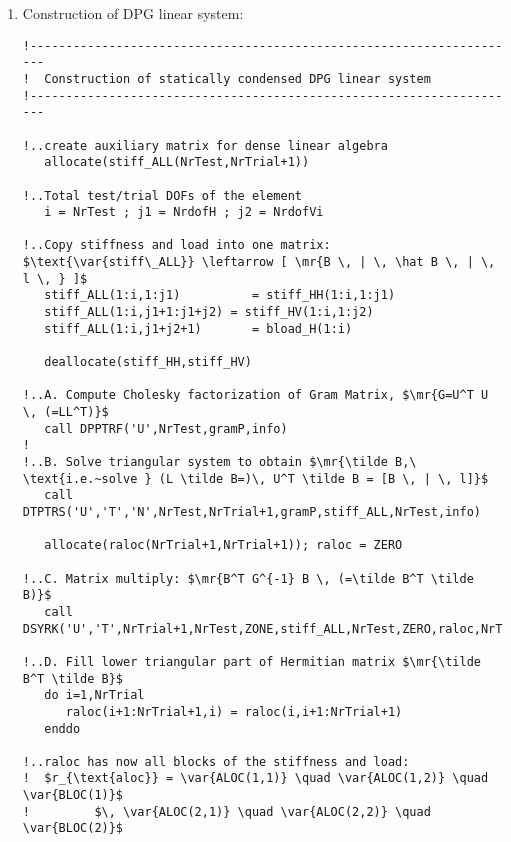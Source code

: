 \begin{enumerate}
{\begin{lstlisting}[mathescape,caption=\file{POISSON/PRIMAL\_DPG/}\routine{elem}: boundary integration.]
!     ...loop through enriched H1 test functions
         do k1=1,nrdofHH
            v = shapHH(k1)

!        ...loop through H(div) trial functions
            do k2=1,nrdofVi
!           ...Piola transformation
               s(1:3) = (dxdxi(1:3,1)*shapV(1,k2) + &
                          dxdxi(1:3,2)*shapV(2,k2) + &
                          dxdxi(1:3,3)*shapV(3,k2)) / rjac
!           ...normal component
               sn = s(1)*rn(1)+s(2)*rn(2)+s(3)*rn(3)
!
!           ...accumulate stiffness: $-\lb \sigma \cdot n, v \rb_{\Gamma_h}$
               stiff_HV(k1,k2) = stiff_HV(k1,k2) - sn*v*weight

            enddo; enddo ! end loop through trial / test functions
   enddo; enddo; ! end loop through integration points / faces
\end{lstlisting}
	}
	\item{ Construction of DPG linear system:
\begin{lstlisting}[mathescape,caption=\file{POISSON/PRIMAL\_DPG/}\routine{elem}: constructing DPG linear system.]
!---------------------------------------------------------------------
!  Construction of statically condensed DPG linear system
!---------------------------------------------------------------------

!..create auxiliary matrix for dense linear algebra
   allocate(stiff_ALL(NrTest,NrTrial+1))

!..Total test/trial DOFs of the element
   i = NrTest ; j1 = NrdofH ; j2 = NrdofVi

!..Copy stiffness and load into one matrix: $\text{\var{stiff\_ALL}} \leftarrow [ \mr{B \, | \, \hat B \, | \, l \, } ]$
   stiff_ALL(1:i,1:j1)          = stiff_HH(1:i,1:j1)
   stiff_ALL(1:i,j1+1:j1+j2) = stiff_HV(1:i,1:j2)
   stiff_ALL(1:i,j1+j2+1)       = bload_H(1:i)

   deallocate(stiff_HH,stiff_HV)

!..A. Compute Cholesky factorization of Gram Matrix, $\mr{G=U^T U \, (=LL^T)}$
   call DPPTRF('U',NrTest,gramP,info)
!
!..B. Solve triangular system to obtain $\mr{\tilde B,\ \text{i.e.~solve } (L \tilde B=)\, U^T \tilde B = [B \, | \, l]}$
   call DTPTRS('U','T','N',NrTest,NrTrial+1,gramP,stiff_ALL,NrTest,info)

   allocate(raloc(NrTrial+1,NrTrial+1)); raloc = ZERO

!..C. Matrix multiply: $\mr{B^T G^{-1} B \, (=\tilde B^T \tilde B)}$
   call DSYRK('U','T',NrTrial+1,NrTest,ZONE,stiff_ALL,NrTest,ZERO,raloc,NrTrial+1)

!..D. Fill lower triangular part of Hermitian matrix $\mr{\tilde B^T \tilde B}$
   do i=1,NrTrial
      raloc(i+1:NrTrial+1,i) = raloc(i,i+1:NrTrial+1)
   enddo

!..raloc has now all blocks of the stiffness and load:
!  $r_{\text{aloc}} = \var{ALOC(1,1)} \quad \var{ALOC(1,2)} \quad \var{BLOC(1)}$
!         $\, \var{ALOC(2,1)} \quad \var{ALOC(2,2)} \quad \var{BLOC(2)}$
\end{lstlisting}
	}
\end{enumerate}

